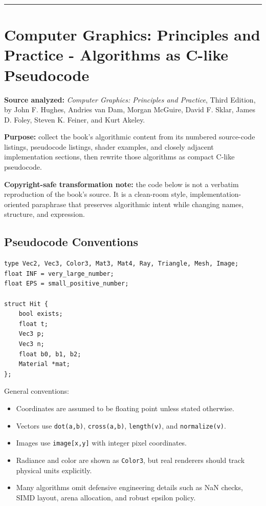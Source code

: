 \documentclass[10pt,letterpaper]{article}
\begin{document}
\medskip\hrule\medskip


\section{Computer Graphics: Principles and Practice - Algorithms as C-like Pseudocode}

\textbf{Source analyzed:} \emph{Computer Graphics: Principles and Practice}, Third Edition, by John F. Hughes, Andries van Dam, Morgan McGuire, David F. Sklar, James D. Foley, Steven K. Feiner, and Kurt Akeley.

\textbf{Purpose:} collect the book's algorithmic content from its numbered source-code listings, pseudocode listings, shader examples, and closely adjacent implementation sections, then rewrite those algorithms as compact C-like pseudocode.

\textbf{Copyright-safe transformation note:} the code below is not a verbatim reproduction of the book's source. It is a clean-room style, implementation-oriented paraphrase that preserves algorithmic intent while changing names, structure, and expression.

\subsection{Pseudocode Conventions}

\begin{verbatim}
type Vec2, Vec3, Color3, Mat3, Mat4, Ray, Triangle, Mesh, Image;
float INF = very_large_number;
float EPS = small_positive_number;

struct Hit {
    bool exists;
    float t;
    Vec3 p;
    Vec3 n;
    float b0, b1, b2;
    Material *mat;
};
\end{verbatim}

General conventions:

\begin{itemize}
\item Coordinates are assumed to be floating point unless stated otherwise.
\item Vectors use \texttt{dot(a,b)}, \texttt{cross(a,b)}, \texttt{length(v)}, and \texttt{normalize(v)}.
\item Images use \texttt{image[x,y]} with integer pixel coordinates.
\item Radiance and color are shown as \texttt{Color3}, but real renderers should track physical units explicitly.
\item Many algorithms omit defensive engineering details such as NaN checks, SIMD layout, arena allocation, and robust epsilon policy.
\end{itemize}
\end{document}
